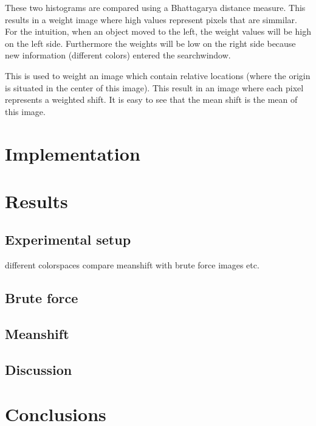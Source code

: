 \documentclass[a4paper,11pt]{article}
\begin{document}
	These two histograms are compared using a Bhattagarya distance measure. This
	results in a weight image where high values represent pixels that are
	simmilar.  For the intuition, when an object moved to the left, the weight
	values will be high on the left side. Furthermore the weights will be low on
	the right side because new information (different colors) entered the
	searchwindow. 

	This is used to weight an image which contain relative locations
	(where the origin is situated in the center of this image). This result in
	an image where each pixel represents a weighted shift. It is easy to see
	that the mean shift is the mean of this image.
	




\section{Implementation}

\section{Results} 
	\subsection{Experimental setup} 
	different colorspaces
	compare meanshift with brute force
	images etc.
	\subsection{Brute force} 
	\subsection{Meanshift} 
\subsection{Discussion} %


\section{Conclusions} \label{sec:conc}
\end{document}
